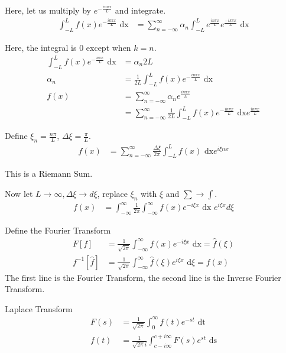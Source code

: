 \documentclass{article}
\begin{document}
Here, let us multiply by $e^{-\frac{i n \pi x}{L}}$ and integrate.
%
\begin{align}
  \int^L_{-L} f(x)e^{-\frac{i k \pi x}{L}} \text{ dx} & =
  \sum^\infty_{n = -\infty} \alpha_n \int^L_{-L} e^{\frac{i n \pi x}{L}} e^{\frac{-i k \pi x}{L}} \text{ dx}
\end{align}

Here, the integral is $0$ except when $k = n$.
%
\begin{align}
  \int^L_{-L} f(x) e^{- \frac{n \pi x}{L}} \text{ dx} & = \alpha_n 2L\\
  \alpha_n & = \frac{1}{2L} \int^L_{-L} f(x)e^{-\frac{i n \pi x}{L}} \text{ dx}\\
  f(x) & = \sum^\infty_{n = -\infty} \alpha_n e^{\frac{i n \pi x}{L}}\\
  & = \sum^\infty_{n = -\infty} \frac{1}{2L} \int^L_{-L} f(x) e^{- \frac{i n \pi x}{L}} \text{ dx} e^{\frac{i n \pi x}{L}}
\end{align}


Define $\xi_n = \frac{n \pi}{L}$, $\Delta \xi = \frac{\pi}{L}$.
%
\begin{align}
  f(x) & = \sum^\infty_{n = -\infty} \frac{\Delta \xi}{2 \pi} \int^L_{-L} f(x) \text{ dx} e^{i \xi n x}
\end{align}

This is a Riemann Sum.

Now let $L \to \infty, \Delta \xi \to d \xi$, replace $\xi_n$ with $\xi$ and $\sum \rightarrow \int$.
%
\begin{align}
  f(x) & = \int^\infty_{-\infty} \frac{1}{2 \pi} \int^\infty_{-\infty} f(x) e^{-i \xi x} \text{ dx } e^{i \xi x} d\xi
\end{align}

Define the Fourier Transform
%
\begin{align}
  F[f] & = \frac{1}{\sqrt {2 \pi}} \int^\infty_{- \infty} f(x) e^{-i \xi x} \text{ dx} = \hat f(\xi)\\
  f^{-1}[\hat f] & = \frac{1}{\sqrt{2 \pi}} \int^\infty_{- \infty} \hat f(\xi) e^{i \xi x} \text{ d}\xi = f(x)
\end{align}
The first line is the Fourier Transform, the second line is the Inverse Fourier Transform.

\note Laplace Transform
%
\begin{align}
  F(s) & = \frac{1}{\sqrt{2 \pi}} \int^\infty_0 f(t) e^{-st} \text{ dt}\\
  f(t) & = \frac{1}{\sqrt{2 \pi} i} \int^{c + i \infty}_{c - i\infty} F(s)e^{st} \text{ ds}
\end{align}
\end{document}
